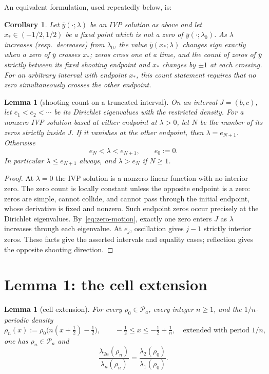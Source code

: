 ﻿\documentclass[11pt]{article}
\newtheorem{lemma}[theorem]{Lemma}
\newtheorem{corollary}[theorem]{Corollary}
\begin{document}
\noindent An equivalent formulation, used repeatedly below, is:

\begin{corollary}\label{cor:crossing}
	Let $\bar y(\cdot;\lambda)$ be an IVP solution as above and let
	$x_*\in(-1/2,1/2)$ be a fixed point which is not a zero of
	$\bar y(\cdot;\lambda_0)$.  As $\lambda$ increases (resp.\ decreases)
	from $\lambda_0$, the value $\bar y(x_*;\lambda)$ changes sign exactly
	when a zero of $\bar y$ crosses $x_*$; zeros cross one at a time, and
	the count of zeros of $\bar y$ strictly between its fixed shooting
	endpoint and $x_*$ changes by $\pm 1$ at each crossing.
	For an arbitrary interval with endpoint $x_*$, this count statement
	requires that no zero simultaneously crosses the other endpoint.
\end{corollary}

\begin{lemma}[shooting count on a truncated interval]\label{lem:count}
 On an interval $J=(b,c)$, let $e_1<e_2<\cdots$ be its Dirichlet
 eigenvalues with the restricted density. For a nonzero IVP solution
 based at either endpoint at $\lambda>0$, let $N$ be the number of its
 zeros strictly inside $J$. If it vanishes at the other endpoint, then
 $\lambda=e_{N+1}$. Otherwise
 \[
 e_N<\lambda<e_{N+1},\qquad e_0:=0.
 \]
 In particular $\lambda\le e_{N+1}$ always, and $\lambda>e_N$ if $N\ge1$.
\end{lemma}

\begin{proof}
 At $\lambda=0$ the IVP solution is a nonzero linear function with no
 interior zero. The zero count is locally constant unless the opposite
 endpoint is a zero: zeros are simple, cannot collide, and cannot pass
 through the initial endpoint, whose derivative is fixed and nonzero.
 Such endpoint zeros occur precisely at the Dirichlet eigenvalues.
 By~\eqref{eq:zero-motion}, exactly one zero enters $J$ as $\lambda$
 increases through each eigenvalue. At $e_j$, oscillation gives $j-1$
 strictly interior zeros. These facts give the asserted intervals and
 equality cases; reflection gives the opposite shooting direction.
\end{proof}

\section{Lemma 1: the cell extension}\label{sec:lemma1}

\begin{lemma}[cell extension]\label{lem:cell}
	For every $\rho_0\in\mathcal P_a$, every integer $n\ge 1$, and the
	$1/n$-periodic density
	\begin{equation*}
		\rho_n(x):=\rho_0\bigl(n(x+\tfrac12)-\tfrac12\bigr),
		\qquad -\tfrac12\le x\le -\tfrac12+\tfrac1n,
		\quad\text{extended with period }1/n,
	\end{equation*}
	one has $\rho_n\in\mathcal P_a$ and
	\begin{equation}
		\frac{\lambda_{2n}(\rho_n)}{\lambda_n(\rho_n)}
		=\frac{\lambda_2(\rho_0)}{\lambda_1(\rho_0)}.
		\label{eq:cellidentity}
	\end{equation}
\end{lemma}
\end{document}
